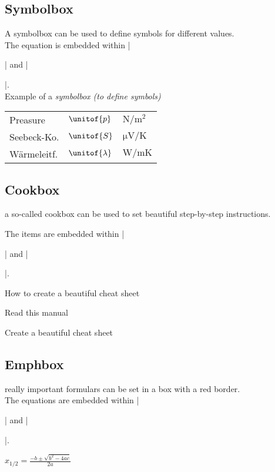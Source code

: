 \documentclass[english]{latex4ei_fs}
\begin{document}
\begin{sectionbox}
	\subsection{Symbolbox}
	A symbolbox can be used to define symbols for different values. \\

	The equation is embedded within \code|\begin{symbolbox}| and 
	\code|\end{symbolbox}|. \\

	Example of a \emph{symbolbox (to define symbols)}
	\renewcommand{\arraystretch}{2.0}
	\begin{symbolbox}
		\begin{tabular}{lll}
		Preasure & $\unitof{p}$ & $\si{\newton\per\meter\squared}$ \\
		Seebeck-Ko. & $\unitof{S}$ & $\si{\micro\volt\per\kelvin}$\\
		Wärmeleitf. & $\unitof{\lambda}$ & $\si{\watt\per\meter\kelvin}$
		\end{tabular}
	\end{symbolbox}	
\end{sectionbox}


\begin{sectionbox}
	\subsection{Cookbox}
	a so-called cookbox can be used to set beautiful step-by-step instructions.

	The items are embedded within \code|\begin{cookbox}| and 
	\code|\end{cookbox}|. \\

	\begin{cookbox}{How to create a beautiful cheat sheet}
		\item Read this manual
		\item Create a beautiful cheat sheet
	\end{cookbox}
\end{sectionbox}


\begin{sectionbox}
	\subsection{Emphbox}
	really important formulars can be set in a box with a red border. \\

	The equations are embedded within \code|\begin{emphbox}| and 
	\code|\end{emphbox}|. \\

	\begin{emphbox}
		$x_{1/2}=\frac{ -b \pm \sqrt{b^2-4ac} }{ 2a }$
	\end{emphbox}
\end{sectionbox}
\end{document}
